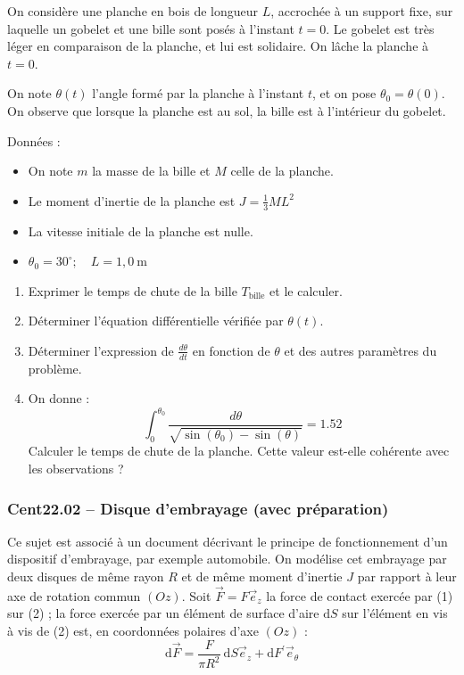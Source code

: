 On considère une planche en bois de longueur $L$, accrochée à un support fixe, sur laquelle un gobelet et une bille sont posés à l'instant $t = 0$. Le gobelet est très léger en comparaison de la planche, et lui est solidaire. On lâche la planche à $t = 0$.

\begin{center}
\end{center}
On note $\theta(t)$ l'angle formé par la planche à l'instant $t$, et on pose $\theta_0=\theta(0)$. On observe que lorsque la planche est au sol, la bille est à l'intérieur du gobelet.

Données :
\begin{itemize}
\item On note $m$ la masse de la bille et $M$ celle de la planche.
\item Le moment d'inertie de la planche est $J=\frac{1}{3} M L^2$
\item La vitesse initiale de la planche est nulle.
\item $\theta_0=30^{\circ} ; \quad L=1,0 \mathrm{~m}$
\end{itemize}

\begin{enumerate}
    \item Exprimer le temps de chute de la bille $T_{\text{bille}}$ et le calculer.
    \item Déterminer l'équation différentielle vérifiée par $\theta(t)$.
    \item Déterminer l'expression de $\frac{d\theta}{dt}$ en fonction de $\theta$ et des autres paramètres du problème.
    \item On donne :
    \[
    \int_0^{\theta_0} \frac{d\theta}{\sqrt{\sin(\theta_0) - \sin(\theta)}} = 1.52
    \]
    Calculer le temps de chute de la planche. Cette valeur est-elle cohérente avec les observations ?
\end{enumerate}


\newpage
\subsubsection*{Cent22.02 -- Disque d'embrayage (avec préparation)  \corrige}

Ce sujet est associé à un document décrivant le principe de fonctionnement d'un dispositif d'embrayage, par exemple automobile. On modélise cet embrayage par deux disques de même rayon $R$ et de même moment d'inertie $J$ par rapport à leur axe de rotation commun $(O z)$. Soit $\vec{F}=F \vec{e}_z$ la force de contact exercée par (1) sur (2) ; la force exercée par un élément de surface d'aire $\mathrm{d} S$ sur l'élément en vis à vis de (2) est, en coordonnées polaires d'axe $(O z)$ :
$$
\mathrm{d} \vec{F}=\frac{F}{\pi R^2} \mathrm{~d} S \vec{e}_z+\mathrm{d} F^{\prime} \vec{e}_\theta
$$
\begin{center}
\end{center}

